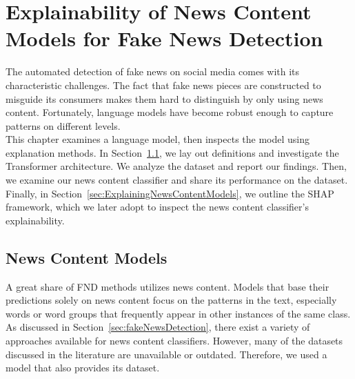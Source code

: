 
\chapter{Explainability of News Content Models for Fake News Detection}\label{chapter:NewsContentModelsForFND}
The automated detection of fake news on social media comes with its characteristic challenges. The fact
that fake news pieces are constructed to misguide its consumers makes them hard to distinguish by only using news content. Fortunately, language models have become robust enough to capture patterns on different levels.\\
This chapter examines a language model, then inspects the model using explanation methods. In Section~\ref{sec:newsContentModels}, we lay out definitions and investigate the Transformer architecture. We analyze the dataset and report our findings. Then, we examine our news content classifier and share its performance on the dataset. Finally, in Section~\ref{sec:ExplainingNewsContentModels}, we outline the SHAP framework, which we later adopt to inspect the news content classifier's explainability.

\section{News Content Models}
\label{sec:newsContentModels}
A great share of FND methods utilizes news content. Models that base their predictions solely on news content focus on the patterns in the text, especially words or word groups that frequently appear in other instances of the same class. As discussed in Section~\ref{sec:fakeNewsDetection}, there exist a variety of approaches available for news content classifiers. However, many of the datasets discussed in the literature are unavailable or outdated. Therefore, we used a model that also provides its dataset.

